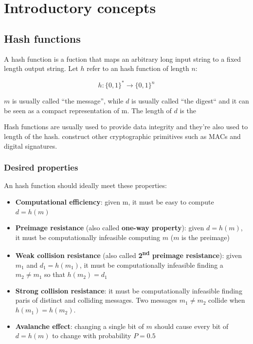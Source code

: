 \section{Introductory concepts}

\subsection{Hash functions}
A hash function is a fuction that maps an arbitrary long input string to a fixed
length output string. Let $h$ refer to an hash function of length $n$:

\[
  h\colon \{0,1\}^* \to \{0,1\}^n
\]

$m$ is usually called ``the message'', while $d$ is usually called ``the digest``
and it can be seen as a compact representation of m. The length of $d$ is the

Hash functions are usually used to provide data integrity and they're also used to
length of the hash.
construct other cryptographic primitives such as MACs and digital signatures.

\subsubsection{Desired properties}
An hash function should ideally meet these properties:
\begin{itemize}
  \item \textbf{Computational efficiency}: given m, it must be easy to compute ${d=h(m)}$
  \item \textbf{Preimage resistance} (also called \textbf{one-way property}):
  given ${d=h(m)}$, it must be computationally infeasible computing $m$ ($m$ is the
  preimage)
  \item \textbf{Weak collision resistance} (also called
  \textbf{2\textsuperscript{nd} preimage resistance}): given $m_1$ and ${d_1=h(m_1)}$,
  it must be computationally infeasible finding a $m_2 \neq m_1$ so that ${h(m_2)=d_1}$
  \item \textbf{Strong collision resistance}: it must be computationally infeasible
  finding paris of distinct and colliding messages. Two messages $m_1\neq m_2$
  collide when ${h(m_1)=h(m_2)}$.
  \item \textbf{Avalanche effect}: changing a single bit of $m$ should cause every
  bit of ${d=h(m)}$ to change with probability ${P=0.5}$
\end{itemize}

